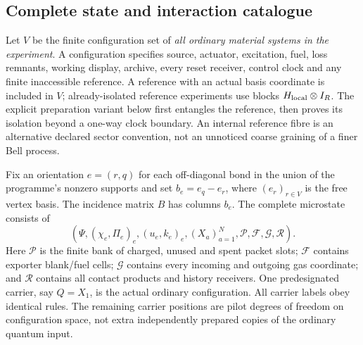 \documentclass[11pt,oneside,openany]{book}
\theoremstyle{definition}
\theoremstyle{remark}\newtheorem{remark}[theorem]{Remark}
\begin{document}
\subsection{Complete state and interaction catalogue}
Let $V$ be the finite configuration set of \emph{all ordinary material systems in the experiment}. A configuration specifies source, actuator, excitation, fuel, loss remnants, working display, archive, every reset receiver, control clock and any finite inaccessible reference. A reference with an actual basis coordinate is included in $V$; already-isolated reference experiments use blocks $H_{\rm local}\otimes I_R$. The explicit preparation variant below first entangles the reference, then proves its isolation beyond a one-way clock boundary. An internal reference fibre is an alternative declared sector convention, not an unnoticed coarse graining of a finer Bell process.

Fix an orientation $e=(r,q)$ for each off-diagonal bond in the union of the programme's nonzero supports and set $b_e=e_q-e_r$, where $(e_r)_{r\in V}$ is the free vertex basis. The incidence matrix $B$ has columns $b_e$. The complete microstate consists of
\begin{equation}
 \left(\Psi,(\chi_e,\Pi_e)_e,(u_e,k_e)_e,
       (X_a)_{a=1}^N,\mathcal P,\mathcal F,\mathcal G,\mathcal R\right).
 \label{p:eq-microstate}
\end{equation}
Here $\mathcal P$ is the finite bank of charged, unused and spent packet slots; $\mathcal F$ contains exporter blank/fuel cells; $\mathcal G$ contains every incoming and outgoing gas coordinate; and $\mathcal R$ contains all contact products and history receivers. One predesignated carrier, say $Q=X_1$, is the actual ordinary configuration. All carrier labels obey identical rules. The remaining carrier positions are pilot degrees of freedom on configuration space, not extra independently prepared copies of the ordinary quantum input.
\end{document}
